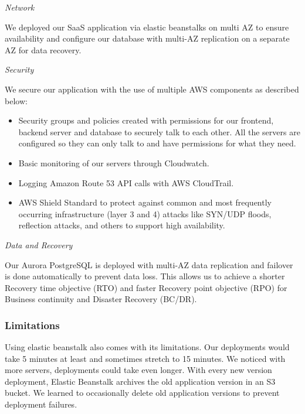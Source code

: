 \documentclass[a4paper]{article}
\begin{document}
            \textit{Network}
            
            We deployed our SaaS application via elastic beanstalks on multi AZ to ensure availability and configure our database with multi-AZ replication on a separate AZ for data recovery.
            
            \textit{Security}
            
            We secure our application with the use of multiple AWS components as described below:
            \begin{itemize}
                \item Security groups and policies created with permissions for our frontend, backend server and database to securely talk to each other. All the servers are configured so they can only talk to and have permissions for what they need.
                \item Basic monitoring of our servers through Cloudwatch.
                \item Logging Amazon Route 53 API calls with AWS CloudTrail.
                \item AWS Shield Standard to protect against common and most frequently occurring infrastructure (layer 3 and 4) attacks like SYN/UDP floods, reflection attacks, and others to support high availability.
            \end{itemize}
            
            \textit{Data and Recovery}
            
            Our Aurora PostgreSQL is deployed with multi-AZ data replication and failover is done automatically to prevent data loss. This allows us to achieve a shorter Recovery time objective (RTO) and faster Recovery point objective (RPO) for Business continuity and Disaster Recovery (BC/DR).

        \subsubsection{Limitations}
        
        Using elastic beanstalk also comes with its limitations. Our deployments would take 5 minutes at least and sometimes stretch to 15 minutes. We noticed with more servers, deployments could take even longer. With every new version deployment, Elastic Beanstalk archives the old application version in an S3 bucket. We learned to occasionally delete old application versions to prevent deployment failures.
\end{document}
